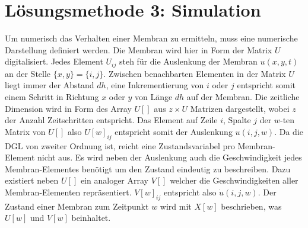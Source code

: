 %
%
%
\section{Lösungsmethode 3: Simulation 
	\label{kreismembran:section:teil4}}

Um numerisch das Verhalten einer Membran zu ermitteln, muss eine numerische Darstellung definiert werden.
Die Membran wird hier in Form der Matrix $  U $ digitalisiert.
Jedes Element  $ U_{ij} $ steh für die Auslenkung der Membran $ u(x,y,t) $ an der Stelle $ \{x,y\}=\{i,j\} $.
Zwischen benachbarten Elementen in der Matrix $ U $ liegt immer der Abstand $ dh $, eine Inkrementierung von $ i $ oder $ j $ entspricht somit einem Schritt in Richtung $ x $ oder $ y $ von Länge $ dh $ auf der Membran.
Die zeitliche Dimension wird in Form des Array $  U[] $ aus $ z \times U $ Matrizen dargestellt, wobei $ z $ der Anzahl Zeitschritten entspricht.
Das Element auf Zeile $ i $, Spalte $ j $ der $ w $-ten Matrix von $ U[] $ also $ U[w]_{ij} $ entspricht somit der Auslenkung $ u(i,j,w) $.
Da die DGL von zweiter Ordnung ist, reicht eine Zustandsvariabel pro Membran-Element nicht aus. 
Es wird neben der Auslenkung auch die Geschwindigkeit jedes Membran-Elementes benötigt um den Zustand eindeutig zu beschreiben. 
Dazu existiert neben $ U[] $ ein analoger Array $ V[] $ welcher die Geschwindigkeiten aller Membran-Elementen repräsentiert. 
$ V[w]_{ij} $ entspricht also $ \dot{u}(i,j,w) $. 
Der Zustand einer Membran zum Zeitpunkt $ w $ wird mit $ X[w] $ beschrieben, was $ U[w] $ und $ V[w] $ beinhaltet.

